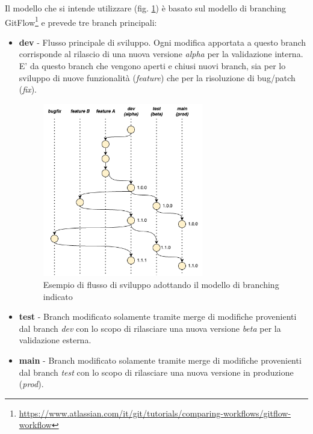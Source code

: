 Il modello che si intende utilizzare (fig. \ref{branching}) è basato sul modello di branching GitFlow\footnote{\href{https://www.atlassian.com/it/git/tutorials/comparing-workflows/gitflow-workflow}{https://www.atlassian.com/it/git/tutorials/comparing-workflows/gitflow-workflow}} e prevede tre branch principali:

\begin{itemize}
    \item \textbf{dev} - Flusso principale di sviluppo. Ogni modifica apportata a questo branch corrisponde al rilascio di una nuova versione \textit{alpha} per la validazione interna. E' da questo branch che vengono aperti e chiusi nuovi branch, sia per lo sviluppo di nuove funzionalità (\textit{feature}) che per la risoluzione di bug/patch (\textit{fix}).

    \begin{figure}[H]
        \centering
        \includegraphics[width=0.66\textwidth]{img/branching-model.png}
        \caption{Esempio di flusso di sviluppo adottando il modello di branching indicato}
        \label{branching}
    \end{figure}
    
    \item \textbf{test} - Branch modificato solamente tramite merge di modifiche provenienti dal branch \textit{dev} con lo scopo di rilasciare una nuova versione \textit{beta} per la validazione esterna.
    \item \textbf{main} - Branch modificato solamente tramite merge di modifiche provenienti dal branch \textit{test} con lo scopo di rilasciare una nuova versione in produzione (\textit{prod}).
\end{itemize}

